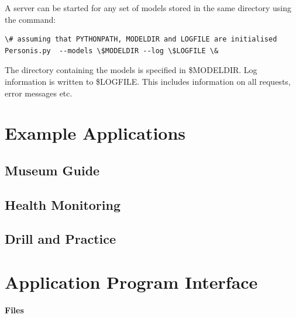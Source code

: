 \documentclass[a4paper,10pt,english]{sphinxmanual}
\begin{document}
A server can be started for any set of models stored in the same directory using the command:

\begin{Verbatim}[commandchars=\\\{\}]
\# assuming that PYTHONPATH, MODELDIR and LOGFILE are initialised
Personis.py  --models \$MODELDIR --log \$LOGFILE \&
\end{Verbatim}

The directory containing the models is specified in \$MODELDIR.
Log information is written to \$LOGFILE. This includes information on all requests, error messages etc.


\chapter{Example Applications}
\label{Examples::doc}\label{Examples:example-applications}

\section{Museum Guide}
\label{Examples:museum-guide}

\section{Health Monitoring}
\label{Examples:health-monitoring}

\section{Drill and Practice}
\label{Examples:drill-and-practice}

\chapter{Application Program Interface}
\label{API:application-program-interface}\label{API::doc}
\textbf{Files}
\end{document}
